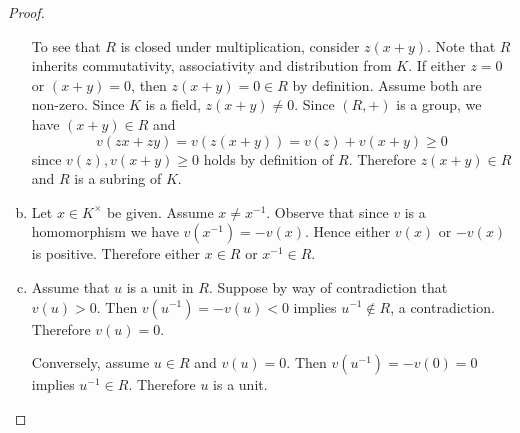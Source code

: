 \documentclass[10pt]{amsart}
\begin{document}
\begin{thm}
\begin{proof}
\begin{enumerate}[(a)]
      To see that $R$ is closed under multiplication, consider $z(x + y)$.
      Note that $R$ inherits commutativity, associativity and distribution from $K$.
      If either $z = 0$ or $(x+y) = 0$, then $z(x + y) = 0 \in R$ by definition.
      Assume both are non-zero.
      Since $K$ is a field, $z(x + y) \neq 0$.
      Since $(R, +)$ is a group, we have $(x + y) \in R$ and       
      $$v(zx + zy) = v(z(x+y)) = v(z) + v(x + y) \geq 0$$
      since $v(z), v(x + y) \geq 0$ holds by definition of $R$.
      Therefore $z(x + y) \in R$ and $R$ is a subring of $K$.
    \item
      Let $x \in K^\times$ be given.
      Assume $x \neq x^{-1}$.
      Observe that since $v$ is a homomorphism we have $v(x^{-1}) = -v(x)$.
      Hence either $v(x)$ or $-v(x)$ is positive.
      Therefore either $x \in R$ or $x^{-1} \in R$.
    \item
      Assume that $u$ is a unit in $R$.
      Suppose by way of contradiction that $v(u) > 0$.
      Then $v(u^{-1}) = -v(u) < 0$ implies $u^{-1} \not \in R$, a contradiction.
      Therefore $v(u) = 0$.
      
      Conversely, assume $u \in R$ and $v(u) = 0$.
      Then $v(u^{-1}) = -v(0) = 0$ implies $u^{-1} \in R$.
      Therefore $u$ is a unit.
    \end{enumerate}
  \end{proof}
\end{thm}
\end{document}
